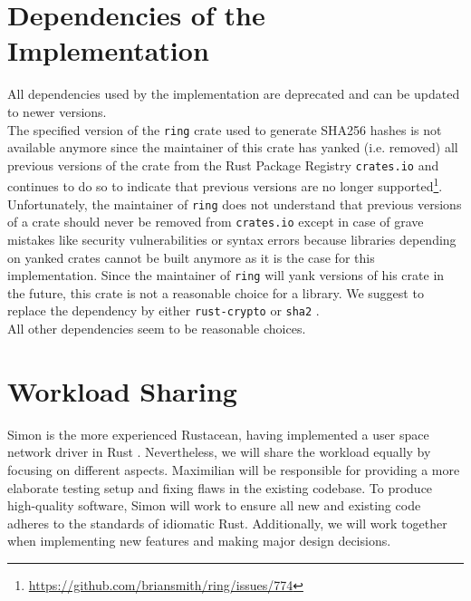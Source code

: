 \documentclass[a4paper, 11pt]{article}
\begin{document}
\section*{Dependencies of the Implementation}
All dependencies used by the implementation are deprecated and can be updated to newer versions.\\
The specified version of the \texttt{ring} \cite{CratesIORing} crate used to generate SHA256 hashes is not available anymore since the maintainer of this crate has yanked (i.e. removed) all previous versions of the crate from the Rust Package Registry \texttt{crates.io} \cite{CratesIO} and continues to do so to indicate that previous versions are no longer supported\footnote{\url{https://github.com/briansmith/ring/issues/774}}.
Unfortunately, the maintainer of \texttt{ring} does not understand that previous versions of a crate should never be removed from \texttt{crates.io} except in case of grave mistakes like security vulnerabilities or syntax errors because libraries depending on yanked crates cannot be built anymore as it is the case for this implementation.
Since the maintainer of \texttt{ring} will yank versions of his crate in the future, this crate is not a reasonable choice for a library.
We suggest to replace the dependency by either \texttt{rust-crypto} \cite{CratesIOCrypto} or \texttt{sha2} \cite{CratesIOSha2}.\\
All other dependencies seem to be reasonable choices.

\section*{Workload Sharing}
Simon is the more experienced Rustacean, having implemented a user space network driver in Rust \cite{Ixy}.
Nevertheless, we will share the workload equally by focusing on different aspects. 
Maximilian will be responsible for providing a more elaborate testing setup and fixing flaws in the existing codebase. 
To produce high-quality software, Simon will work to ensure all new and existing code adheres to the standards of idiomatic Rust.
Additionally, we will work together when implementing new features and making major design decisions.



\end{document}
